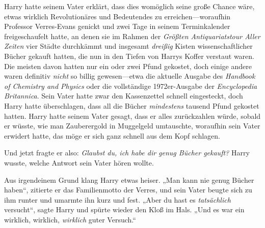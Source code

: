 Harry hatte seinem Vater erklärt, dass dies womöglich seine große Chance wäre, etwas wirklich Revolutionäres und Bedeutendes zu erreichen—woraufhin Professor Verres-Evans genickt und zwei Tage in seinem Terminkalender freigeschaufelt hatte, an denen sie im Rahmen der \emph{Größten Antiquariatstour Aller Zeiten} vier Städte durchkämmt und insgesamt \emph{dreißig} Kisten wissenschaftlicher Bücher gekauft hatten, die nun in den Tiefen von Harrys Koffer verstaut waren. Die meisten davon hatten nur ein oder zwei Pfund gekostet, doch einige andere waren definitiv \emph{nicht} so billig gewesen—etwa die aktuelle Ausgabe des \emph{Handbook of Chemistry and Physics} oder die vollständige 1972er-Ausgabe der \emph{Encyclopedia Britannica}. Sein Vater hatte zwar den Kassenzettel schnell eingesteckt, doch Harry hatte überschlagen, dass all die Bücher \emph{mindestens} tausend Pfund gekostet hatten. Harry hatte seinem Vater gesagt, dass er alles zurückzahlen würde, sobald er wüsste, wie man Zauberergold in Muggelgeld umtauschte, woraufhin sein Vater erwidert hatte, das möge er sich ganz schnell aus dem Kopf schlagen.

Und jetzt fragte er also: \emph{Glaubst du, ich habe dir genug Bücher gekauft?} Harry wusste, welche Antwort sein Vater hören wollte.

Aus irgendeinem Grund klang Harry etwas heiser. „Man kann nie genug Bücher haben“, zitierte er das Familienmotto der Verres, und sein Vater beugte sich zu ihm runter und umarmte ihn kurz und fest. „Aber du hast es \emph{tatsächlich} versucht“, sagte Harry und spürte wieder den Kloß im Hals. „Und es war ein wirklich, wirklich, \emph{wirklich} guter Versuch.“

